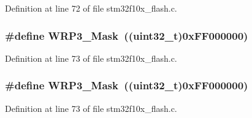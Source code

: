 Definition at line 72 of file stm32f10x\+\_\+flash.\+c.

\subsubsection[{\texorpdfstring{W\+R\+P3\+\_\+\+Mask}{WRP3_Mask}}]{\setlength{\rightskip}{0pt plus 5cm}\#define W\+R\+P3\+\_\+\+Mask~(({\bf uint32\+\_\+t})0x\+F\+F000000)}\hypertarget{group___f_l_a_s_h___private___defines_ga649ce8b78520ca192b41aabe2daef035}{}\label{group___f_l_a_s_h___private___defines_ga649ce8b78520ca192b41aabe2daef035}


Definition at line 73 of file stm32f10x\+\_\+flash.\+c.

\subsubsection[{\texorpdfstring{W\+R\+P3\+\_\+\+Mask}{WRP3_Mask}}]{\setlength{\rightskip}{0pt plus 5cm}\#define W\+R\+P3\+\_\+\+Mask~(({\bf uint32\+\_\+t})0x\+F\+F000000)}\hypertarget{group___f_l_a_s_h___private___defines_ga649ce8b78520ca192b41aabe2daef035}{}\label{group___f_l_a_s_h___private___defines_ga649ce8b78520ca192b41aabe2daef035}


Definition at line 73 of file stm32f10x\+\_\+flash.\+c.

